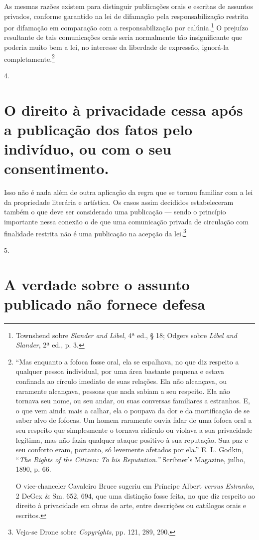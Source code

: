 As mesmas razões existem para distinguir publicações orais e escritas de
assuntos privados, conforme garantido na lei de difamação pela
responsabilização restrita por difamação em comparação com a
responsabilização por calúnia.\footnote{Townshend sobre \emph{Slander
  and Libel}, 4ª ed., § 18; Odgers sobre \emph{Libel and Slander}, 2ª
  ed., p. 3.} O prejuízo resultante de tais comunicações orais seria
normalmente tão insignificante que poderia muito bem a lei, no interesse
da liberdade de expressão, ignorá-la completamente.\footnote{``Mas
  enquanto a fofoca fosse oral, ela se espalhava, no que diz respeito a
  qualquer pessoa individual, por uma área bastante pequena e estava
  confinada ao círculo imediato de suas relações. Ela não alcançava, ou
  raramente alcançava, pessoas que nada sabiam a seu respeito. Ela não
  tornava seu nome, ou seu andar, ou suas conversas familiares a
  estranhos. E, o que vem ainda mais a calhar, ela o poupava da dor e da
  mortificação de se saber alvo de fofocas. Um homem raramente ouvia
  falar de uma fofoca oral a seu respeito que simplesmente o tornava
  ridículo ou violava a sua privacidade legítima, mas não fazia qualquer
  ataque positivo à sua reputação. Sua paz e seu conforto eram,
  portanto, só levemente afetados por ela.'' E. L. Godkin, ``\emph{The
  Rights of the Citizen: To his Reputation.''} Scribner's Magazine,
  julho, 1890, p. 66.

  O vice-chanceler Cavaleiro Bruce sugeriu em Príncipe Albert
  \emph{versus Estranho}, 2 DeGex \& Sm. 652, 694, que uma distinção
  fosse feita, no que diz respeito ao direito à privacidade em obras de
  arte, entre descrições ou catálogos orais e escritos.}

4. \section{O direito à privacidade cessa após a publicação dos fatos
pelo indivíduo, ou com o seu consentimento.}

Isso não é nada além de outra aplicação da regra que se tornou familiar
com a lei da propriedade literária e artística. Os casos assim decididos
estabeleceram também o que deve ser considerado uma publicação --- sendo
o princípio importante nessa conexão o de que uma comunicação privada de
circulação com finalidade restrita não é uma publicação na acepção da
lei.\footnote{Veja-se Drone sobre \emph{Copyrights}, pp. 121, 289, 290.}

5. \section{A verdade sobre o assunto publicado não fornece defesa}


